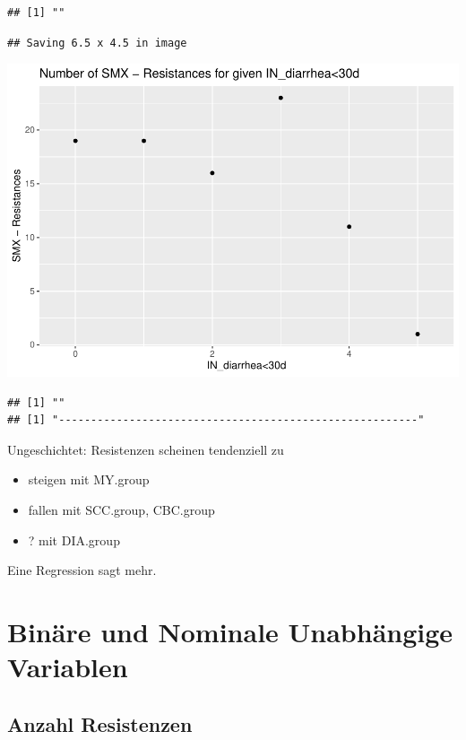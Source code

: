 \documentclass[
]{article}
\providecommand{\tightlist}{%
  \setlength{\itemsep}{0pt}\setlength{\parskip}{0pt}}
\begin{document}
\begin{verbatim}
## [1] ""
\end{verbatim}

\begin{verbatim}
## Saving 6.5 x 4.5 in image
\end{verbatim}

\includegraphics{NResistenzen_files/figure-latex/numerical_variables-40.pdf}

\begin{verbatim}
## [1] ""
## [1] "--------------------------------------------------------"
\end{verbatim}

Ungeschichtet: Resistenzen scheinen tendenziell zu

\begin{itemize}
\tightlist
\item
  steigen mit MY.group
\item
  fallen mit SCC.group, CBC.group
\item
  ? mit DIA.group
\end{itemize}

Eine Regression sagt mehr.

\hypertarget{binuxe4re-und-nominale-unabhuxe4ngige-variablen}{%
\section{Binäre und Nominale Unabhängige
Variablen}\label{binuxe4re-und-nominale-unabhuxe4ngige-variablen}}

\hypertarget{anzahl-resistenzen}{%
\subsection{Anzahl Resistenzen}\label{anzahl-resistenzen}}
\end{document}
